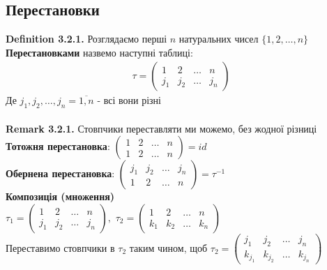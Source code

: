 \documentclass[a4paper, 14pt]{extarticle}
\def\defin#1{\textbf{Definition {#1}}}
\def\rm#1{\textbf{Remark {#1}}}
\def\bigline{\vspace{5mm}\\}
\begin{document}
	\subsection{Перестановки}
	\defin{3.2.1.} Розглядаємо перші $n$ натуральних чисел $\{1,2,\dots,n\}$\\
	\textbf{Перестановками} назвемо наступні таблиці:
	\begin{align*}
	\tau = \begin{pmatrix}
	1 & 2 & \dots & n \\
	j_1 & j_2 & \dots & j_n
	\end{pmatrix}
	\end{align*}
	Де $j_1, j_2, \dots, j_n = \overline{1,n}$ - всі вони різні\\
	\\
	\rm{3.2.1.} Стовпчики переставляти ми можемо, без жодної різниці
	\bigline
	\textbf{Тотожня перестановка}: $\begin{pmatrix}
	1 & 2 & \dots & n \\
	1 & 2 & \dots & n
	\end{pmatrix} = id$
	\bigline
	\textbf{Обернена перестановка}: $\begin{pmatrix}
	j_1 & j_2 & \dots & j_n \\
	1 & 2 & \dots & n
	\end{pmatrix} = \tau^{-1}$
	\bigline
	\textbf{Композиція (множення)}\\
	$ \tau_1	 = \begin{pmatrix}
	1 & 2 & \dots & n \\
	j_1 & j_2 & \dots & j_n
	\end{pmatrix},$ $ \tau_2 = \begin{pmatrix}
	1 & 2 & \dots & n \\
	k_1 & k_2 & \dots & k_n
	\end{pmatrix}$\\
	Переставимо стовпчики в $\tau_2$ таким чином, щоб $ \tau_2 = \begin{pmatrix}
	j_1 & j_2 & \dots & j_n \\
	k_{j_1} & k_{j_2} & \dots & k_{j_n}
	\end{pmatrix}$\\
	
\end{document}
